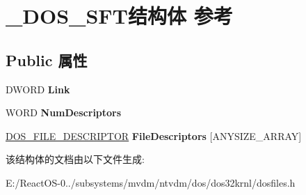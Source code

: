 \hypertarget{struct___d_o_s___s_f_t}{}\section{\+\_\+\+D\+O\+S\+\_\+\+S\+F\+T结构体 参考}
\label{struct___d_o_s___s_f_t}
\subsection*{Public 属性}
\begin{DoxyCompactItemize}
\item 
\mbox{\label{struct___d_o_s___s_f_t_ad1db3891bbf0c1fd7795a926867835db}} 
D\+W\+O\+RD {\bfseries Link}
\item 
\mbox{\label{struct___d_o_s___s_f_t_ac1ad4adfda3167fbab88303e3a666fb9}} 
W\+O\+RD {\bfseries Num\+Descriptors}
\item 
\mbox{\label{struct___d_o_s___s_f_t_aca5e7fa5f0e70f5f476fb409e5886c5f}} 
\hyperlink{struct___d_o_s___f_i_l_e___d_e_s_c_r_i_p_t_o_r}{D\+O\+S\+\_\+\+F\+I\+L\+E\+\_\+\+D\+E\+S\+C\+R\+I\+P\+T\+OR} {\bfseries File\+Descriptors} \mbox{[}A\+N\+Y\+S\+I\+Z\+E\+\_\+\+A\+R\+R\+AY\mbox{]}
\end{DoxyCompactItemize}


该结构体的文档由以下文件生成\+:\begin{DoxyCompactItemize}
\item 
E\+:/\+React\+O\+S-\/0../subsystems/mvdm/ntvdm/dos/dos32krnl/dosfiles.\+h\end{DoxyCompactItemize}
